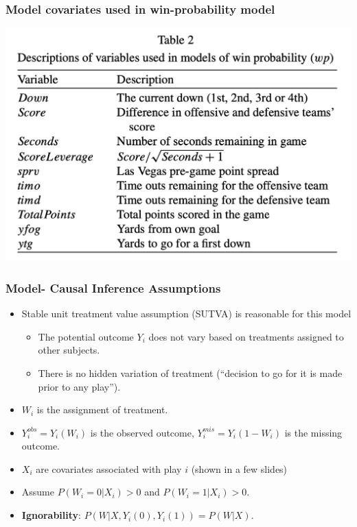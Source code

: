\documentclass[t]{beamer}
\begin{document}
\begin{frame}
  \frametitle{Model covariates used in win-probability model}
  \centering \includegraphics[width=0.8\linewidth]{./covariates_wp.png}
\end{frame}
\begin{frame}

  
  \frametitle{Model- Causal Inference Assumptions}
  \begin{itemize}
  \item Stable unit treatment value assumption (SUTVA) is reasonable for this model
    \begin{itemize}
    \item The potential outcome $Y_i$ does not vary based on treatments assigned to other subjects.
    \item There is no hidden variation of treatment (``decision to go for it is made prior to any play'').
    \end{itemize}
  \item $W_i$ is the assignment of treatment.
  \item $Y_i^{obs} = Y_i(W_i)$ is the observed outcome, $Y_i^{mis} = Y_i(1-W_i)$ is the missing outcome.
   \item $X_i$ are covariates associated with play $i$ (shown in a few slides)
   \item Assume \(P(W_i = 0 | X_i) > 0\) and \(P(W_i=1 | X_i) > 0\).
    \item \textbf{Ignorability}: $P(W | X, Y_i(0), Y_i(1)) = P(W | X)$.
  \end{itemize}
\end{frame}
\end{document}
